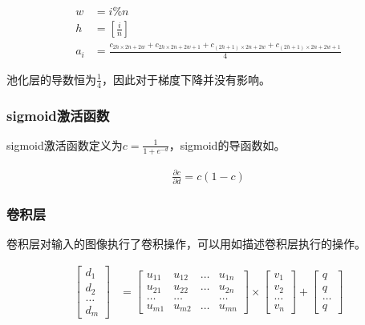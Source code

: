 \begin{equation}\label{eq:pooling-bp}
\begin{aligned}
w &= i \% n \\
h &= [\frac{i}{n}] \\
a_i &= \frac{ 
c_{2 h \times 2n + 2w} +
c_{2 h \times 2n + 2w + 1} + 
c_{ (2h + 1) \times 2n + 2w} + 
c_{ (2h + 1) \times 2n + 2w + 1} }
{4}
\end{aligned}
\end{equation}

池化层的导数恒为$\frac{1}{4}$，因此对于梯度下降并没有影响。

\subsubsection{sigmoid激活函数}

sigmoid激活函数定义为$c=\frac{1}{1+e^{-d}}$，sigmoid的导函数如。

\begin{equation}\label{eq:sigmoid-bp}
\begin{aligned}
\frac{\partial c}{\partial d} = c(1-c)
\end{aligned}
\end{equation}

\subsubsection{卷积层}

卷积层对输入的图像执行了卷积操作，可以用如描述卷积层执行的操作。

\begin{equation}\label{eq:convolution-layer}
\begin{aligned}
\begin{bmatrix}
d_1 \\ d_2 \\ \dots \\ d_m
\end{bmatrix}
&=
\begin{bmatrix}
u_{11} & u_{12} & \dots & u_{1n} \\
u_{21} & u_{22} & \dots & u_{2n} \\
\dots & \dots &   & \dots \\
u_{m1} & u_{m2} & \dots & u_{mn} 
\end{bmatrix}
\times
\begin{bmatrix}
v_1 \\ v_2 \\ \dots \\ v_n
\end{bmatrix}
+
\begin{bmatrix}
q \\ q \\ \dots \\ q
\end{bmatrix}
\end{aligned}
\end{equation}

